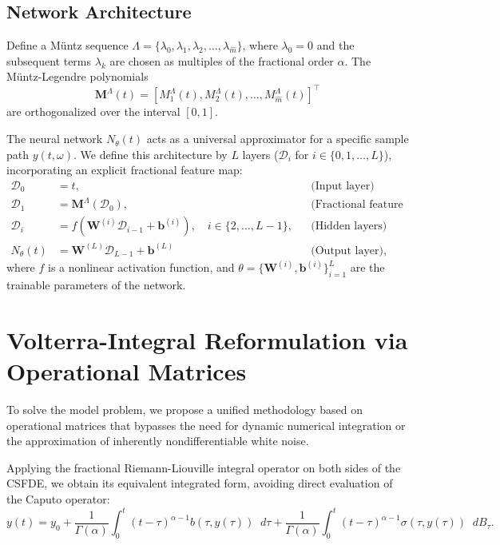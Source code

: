 \documentclass[11pt, a4paper]{article}
\theoremstyle{theoremstyle}
\theoremstyle{definitionstyle}
\newcommand{\dd}{\mathop{}\!d}
\begin{document}
\subsection{Network Architecture}\label{sec:net_arch}
Define a M\"untz sequence $\Lambda = \{\lambda_0, \lambda_1, \lambda_2, \dots, \lambda_{\hat m}\}$, where $\lambda_0 = 0$ and the subsequent terms $\lambda_k$ are chosen as multiples of the fractional order $\alpha$. The M\"untz-Legendre polynomials
\begin{equation} \mathbf M^\Lambda (t) = [M_1^\Lambda(t), M_2^\Lambda(t), \dots, M_{\hat m}^\Lambda(t)]^\top \end{equation}
are orthogonalized over the interval $[0, 1]$.

The neural network $N_\theta(t)$ acts as a universal approximator for a specific sample path $y(t, \omega)$. We define this architecture by $L$ layers ($\mathcal D_i$ for $i \in \{0, 1, \dots, L\}$), incorporating an explicit fractional feature map:
\begin{subequations}
\begin{align}
    \mathcal D_0 &= t, && \text{(Input layer)} \\
    \mathcal D_1 &= \mathbf M^\Lambda(\mathcal D_0), && \text{(Fractional feature layer)} \\
    \mathcal D_i &= f(\mathbf W^{(i)}\mathcal D_{i-1} + \mathbf b^{(i)}), \quad i \in \{2, \dots, L-1\}, && \text{(Hidden layers)} \\
    N_\theta (t) &= \mathbf W^{(L)}\mathcal D_{L-1} + \mathbf b^{(L)} && \text{(Output layer)},
\end{align}
\end{subequations}
where $f$ is a nonlinear activation function, and $\theta = \{\mathbf W^{(i)}, \mathbf b^{(i)}\}_{i=1}^L$ are the trainable parameters of the network.

\section{Volterra-Integral Reformulation via Operational Matrices}\label{sec:volterra}
To solve the model problem, we propose a unified methodology based on operational matrices that bypasses the need for dynamic numerical integration or the approximation of inherently nondifferentiable white noise. 

Applying the fractional Riemann-Liouville integral operator on both sides of the CSFDE, we obtain its equivalent integrated form, avoiding direct evaluation of the Caputo operator:
\begin{equation} y(t) = y_0 + \frac{1}{\Gamma(\alpha)} \int_0^t (t-\tau)^{\alpha-1} b(\tau, y(\tau)) \dd{\tau} + \frac{1}{\Gamma(\alpha)} \int_0^t (t-\tau)^{\alpha-1} \sigma(\tau, y(\tau)) \dd{B_\tau}. \end{equation}
\end{document}
